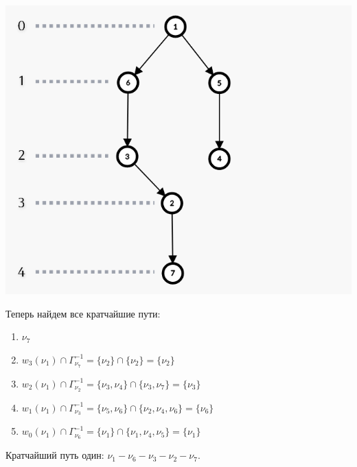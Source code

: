 \documentclass{article}
\begin{document}
\begin{center}
  \includegraphics*[scale=0.4]{./2.png}
\end{center}

Теперь найдем все кратчайшие пути:

\begin{enumerate}
  \item $\nu_7$
  \item $w_{3}(\nu_1) \cap \Gamma^{-1}_{\nu_7}=\{\nu_2\} \cap \{\nu_2\}=\{\nu_2\}$
  \item $w_{2}(\nu_1) \cap \Gamma^{-1}_{\nu_2}=\{\nu_3, \nu_4\} \cap \{\nu_3, \nu_7\}=\{\nu_3\}$
  \item $w_{1}(\nu_1) \cap \Gamma^{-1}_{\nu_3}=\{\nu_5, \nu_6\} \cap \{\nu_2, \nu_4, \nu_6\}=\{\nu_6\}$
  \item $w_{0}(\nu_1) \cap \Gamma^{-1}_{\nu_6}=\{\nu_1\} \cap \{\nu_1, \nu_4, \nu_5\}=\{\nu_1\}$
\end{enumerate}

Кратчайший путь один: $\nu_1 - \nu_6 - \nu_3 - \nu_2 - \nu_7$.
\end{document}
